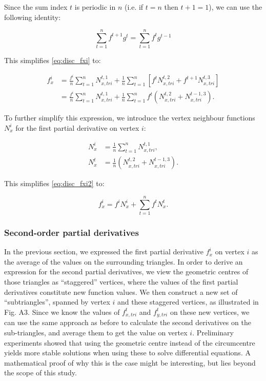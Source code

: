 \documentclass{article}
\begin{document}
Since the sum index $t$ is periodic in $n$ (i.e. if $t=n$ then $t+1=1$), we can use the following identity:

\begin{equation*}
\sum_{t=1}^n f^{t+1} g^t = \sum_{t=1}^n f^t g^{t-1}
\end{equation*}

This simplifies \eqref{eq:disc_fxi} to:

\begin{equation} \label{eq:disc_fxi2}
\begin{split}
f_x^i &= \frac{f^i}{n} \sum_{t=1}^n N_{x,tri}^{t,1} + \frac{1}{n} \sum_{t=1}^n \left[ f^t N_{x,tri}^{t,2} + f^{t+1} N_{x,tri}^{t,3} \right] \\
 &= \frac{f^i}{n} \sum_{t=1}^n N_{x,tri}^{t,1} + \frac{1}{n} \sum_{t=1}^n f^t ( N_{x,tri}^{t,2} + N_{x,tri}^{t-1,3} ).
\end{split}
\end{equation}

To further simplify this expression, we introduce the vertex neighbour functions $N_x^i$ for the first partial derivative on vertex $i$:

\begin{equation} \label{eq:disc_Nx}
\begin{split}
 N_x^i &= \frac{1}{n} \sum_{t=1}^n N_{x,tri}^{t,1}, \\
 N_x^t &= \frac{1}{n} ( N_{x,tri}^{t,2} + N_{x,tri}^{t-1,3} ).
\end{split}
\end{equation}

This simplifies \eqref{eq:disc_fxi2} to:

\begin{equation} \label{eq:disc_fxi3}
f_x^i = f^i N_x^i + \sum_{t=1}^n f^t N_x^t.
\end{equation}

\subsubsection{Second-order partial derivatives}

In the previous section, we expressed the first partial derivative $f_x^i$ on vertex $i$ as the average of the values on the surrounding triangles. In order to derive an expression for the second partial derivatives, we view the geometric centres of those triangles as “staggered” vertices, where the values of the first partial derivatives constitute new function values. We then construct a new set of “subtriangles”, spanned by vertex $i$ and these staggered vertices, as illustrated in Fig. A3. Since we know the values of $f_{x,tri}^t$ and $f_{y,tri}^t$ on these new vertices, we can use the same approach as before to calculate the second derivatives on the sub-triangles, and average them to get the value on vertex $i$. Preliminary experiments showed that using the geometric centre instead of the circumcentre yields more stable solutions when using these to solve differential equations. A mathematical proof of why this is the case might be interesting, but lies beyond the scope of this study.
\end{document}
